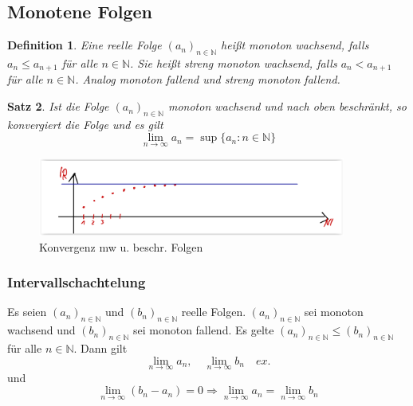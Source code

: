 \documentclass[12pt,a4paper]{report}%
\newtheorem{satz}{Satz}[section]
\newtheorem{definition}[satz]{Definition}
\numberwithin{equation}{section}
\newcommand{\N}{\mathbb{N}}
\numberwithin{equation}{subsection}
\begin{document}
  \subsection{Monotene Folgen}
  \begin{definition}
    Eine reelle Folge $(a_n)_{n \in \N}$ heißt monoton wachsend, falls $a_n \leq a_{n+1}$ für alle $n \in \N$. Sie heißt streng monoton wachsend, falls $a_n < a_{n+1}$ für alle $n \in \N$. Analog monoton fallend und streng monoton fallend.
  \end{definition}
  \begin{satz}
    Ist die Folge $(a_n)_{n \in \N}$ monoton wachsend und nach oben beschränkt, so konvergiert die Folge und es gilt
    \begin{equation}
      \lim_{n\rightarrow \infty} a_n = \sup \lbrace a_n : n\in \N \rbrace
    \end{equation}
  \end{satz}
  \begin{figure}[htbp] 
	  \centering
	  \includegraphics[width=0.9\textwidth]{folge_monoton_beschraenkt.png}
	  \caption{Konvergenz mw u. beschr. Folgen\protect\cite{HM12}}
	  \label{fig:folge_mw_beschr}
	\end{figure}
	
		\subsubsection{Intervallschachtelung}
		Es seien $(a_n)_{n \in \N}$ und $(b_n)_{n \in \N}$ reelle Folgen.
		$(a_n)_{n \in \N}$ sei monoton wachsend und $(b_n)_{n \in \N}$ sei monoton fallend. Es gelte $(a_n)_{n \in \N} \leq (b_n)_{n \in \N}$ für alle $n \in \N$.
    Dann gilt 
    \begin{equation*}
      \lim_{n \rightarrow \infty} a_n,\quad \lim_{n \rightarrow \infty} b_n \quad ex.
    \end{equation*}
    und
    \begin{equation}
      \lim_{n \rightarrow \infty} (b_n - a_n) = 0 \Rightarrow \lim_{n \rightarrow \infty} a_n = \lim_{n \rightarrow \infty} b_n
    \end{equation}
\newpage
\end{document}
